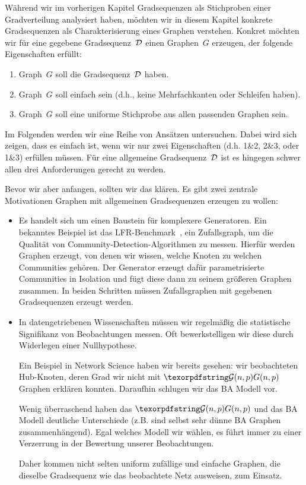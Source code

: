 Während wir im vorherigen Kapitel Gradsequenzen als Stichproben einer Gradverteilung analysiert haben, möchten wir in diesem Kapitel konkrete Gradsequenzen als Charakterisierung eines Graphen verstehen.
Konkret möchten wir für eine gegebene Gradsequenz~$\mathcal{D}$ einen Graphen~$G$ erzeugen, der folgende Eigenschaften erfüllt:
\begin{enumerate}
    \item Graph~$G$ soll die Gradsequenz~$\mathcal{D}$ haben.
    \item Graph~$G$ soll einfach sein (d.h., keine Mehrfachkanten oder Schleifen haben).
    \item Graph~$G$ soll eine uniforme Stichprobe aus allen passenden Graphen sein.
\end{enumerate}

Im Folgenden werden wir eine Reihe von Ansätzen untersuchen.
Dabei wird sich zeigen, dass es einfach ist, wenn wir nur zwei Eigenschaften (d.h. 1\&2, 2\&3, oder 1\&3) erfüllen müssen.
Für eine allgemeine Gradsequenz~$\mathcal{D}$ ist es hingegen schwer allen drei Anforderungen gerecht zu werden.

Bevor wir aber anfangen, sollten wir das  klären.
Es gibt zwei zentrale Motivationen Graphen mit allgemeinen Gradsequenzen erzeugen zu wollen:
\begin{itemize}
    \item
          Es handelt sich um einen Baustein für komplexere Generatoren.
          Ein bekanntes Beispiel ist das LFR-Benchmark~\cite{lancichinetti2008benchmark}, ein Zufallsgraph, um die Qualität von Community-Detection-Algorithmen zu messen.
          Hierfür werden Graphen erzeugt, von denen wir wissen, welche Knoten zu welchen Communities gehören.
          Der Generator erzeugt dafür parametrisierte Communities in Isolation und fügt diese dann zu seinem größeren Graphen zusammen.
          In beiden Schritten müssen Zufallsgraphen mit gegebenen Gradsequenzen erzeugt werden.

    \item
          In datengetriebenen Wissenschaften müssen wir regelmäßig die statistische Signifikanz von Beobachtungen messen.
          Oft bewerkstelligen wir diese durch Widerlegen einer Nullhypothese.

          Ein Beispiel in Network Science haben wir bereits gesehen:
          wir beobachteten Hub-Knoten, deren Grad wir nicht mit $\Gnp$ Graphen erklären konnten.
          Daraufhin schlugen wir das BA Modell vor.

          Wenig überraschend haben das $\Gnp$ und das BA Modell deutliche Unterschiede (z.B. sind selbst sehr dünne BA Graphen zusammenhängend).
          Egal welches Modell wir wählen, es führt immer zu einer Verzerrung in der Bewertung unserer Beobachtungen.

          Daher kommen nicht selten uniform zufällige und einfache Graphen, die dieselbe Gradsequenz wie das beobachtete Netz ausweisen, zum Einsatz.
\end{itemize}

